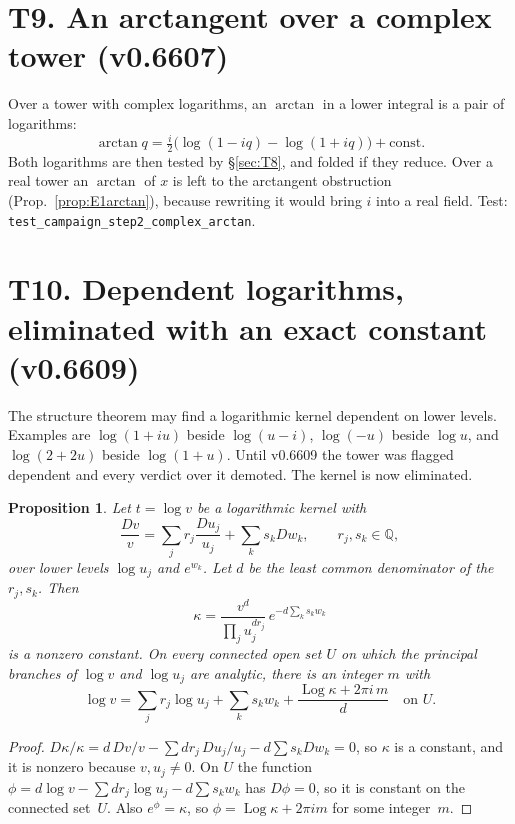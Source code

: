 \documentclass[11pt]{article}
\newtheorem{proposition}[theorem]{Proposition}
\theoremstyle{definition}
\theoremstyle{remark}
\newcommand{\Q}{\mathbb{Q}}
\newcommand{\code}[1]{\texttt{#1}}
\begin{document}
\section*{T9. An arctangent over a complex tower (v0.6607)}

Over a tower with complex logarithms, an $\arctan$ in a lower integral is a pair of
logarithms:
\[ \arctan q=\tfrac i2\bigl(\log(1-iq)-\log(1+iq)\bigr)+\text{const}. \]
Both logarithms are then tested by \S\ref{sec:T8}, and folded if they reduce. Over a
real tower an $\arctan$ of $x$ is left to the arctangent obstruction
(Prop.~\ref{prop:E1arctan}), because rewriting it would bring $i$ into a real field.
Test: \code{test\_campaign\_step2\_complex\_arctan}.

\section*{T10. Dependent logarithms, eliminated with an exact constant (v0.6609)}
\label{sec:T10}

The structure theorem may find a logarithmic kernel dependent on lower levels. Examples
are $\log(1+iu)$ beside $\log(u-i)$, $\log(-u)$ beside $\log u$, and $\log(2+2u)$
beside $\log(1+u)$. Until v0.6609 the tower was flagged dependent and every verdict over
it demoted. The kernel is now eliminated.

\begin{proposition}\label{prop:T10}
Let $t=\log v$ be a logarithmic kernel with
\[ \frac{Dv}{v}=\sum_jr_j\frac{Du_j}{u_j}+\sum_ks_kDw_k,\qquad r_j,s_k\in\Q, \]
over lower levels $\log u_j$ and $e^{w_k}$. Let $d$ be the least common denominator of
the $r_j,s_k$. Then
\[ \kappa=\frac{v^d}{\prod_ju_j^{dr_j}}\,e^{-d\sum_ks_kw_k} \]
is a nonzero constant. On every connected open set $U$ on which the principal branches
of $\log v$ and $\log u_j$ are analytic, there is an integer $m$ with
\[ \log v=\sum_jr_j\log u_j+\sum_ks_kw_k+\frac{\operatorname{Log}\kappa+2\pi i\,m}{d}\quad\text{on }U. \]
\end{proposition}

\begin{proof}
$D\kappa/\kappa=d\,Dv/v-\sum dr_j\,Du_j/u_j-d\sum s_kDw_k=0$, so $\kappa$ is a constant,
and it is nonzero because $v,u_j\ne0$. On $U$ the function
$\phi=d\log v-\sum dr_j\log u_j-d\sum s_kw_k$ has $D\phi=0$, so it is constant on the
connected set~$U$. Also $e^\phi=\kappa$, so $\phi=\operatorname{Log}\kappa+2\pi im$
for some integer~$m$.
\end{proof}
\end{document}
